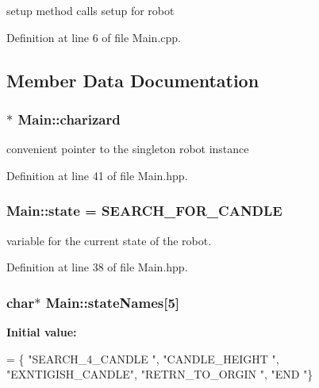 setup method calls setup for robot 



Definition at line 6 of file Main.\-cpp.



\subsection{Member Data Documentation}
\hypertarget{classMain_a6b8534d72e39e2b43c3d46f2ca6e49f4}{
\subsubsection[{charizard}]{$\ast$ Main\-::charizard\hspace{0.3cm}{\ttfamily [private]}}}\label{classMain_a6b8534d72e39e2b43c3d46f2ca6e49f4}


convenient pointer to the singleton robot instance 



Definition at line 41 of file Main.\-hpp.

\hypertarget{classMain_a8b4ada43c3c3720b177018191ac6ee90}{
\subsubsection[{state}]{ Main\-::state = {\bf S\-E\-A\-R\-C\-H\-\_\-\-F\-O\-R\-\_\-\-C\-A\-N\-D\-L\-E}\hspace{0.3cm}{\ttfamily [private]}}}\label{classMain_a8b4ada43c3c3720b177018191ac6ee90}


variable for the current state of the robot. 



Definition at line 38 of file Main.\-hpp.

\hypertarget{classMain_a10090d1fa7fa606c1bf7c5bdf23d7eda}{
\subsubsection[{state\-Names}]{\setlength{\rightskip}{0pt plus 5cm}char$\ast$ Main\-::state\-Names\mbox{[}5\mbox{]}\hspace{0.3cm}{\ttfamily [private]}}}\label{classMain_a10090d1fa7fa606c1bf7c5bdf23d7eda}
{\bfseries Initial value\-:}
\begin{DoxyCode}
= \{
      \textcolor{stringliteral}{"SEARCH\_4\_CANDLE "},
      \textcolor{stringliteral}{"CANDLE\_HEIGHT   "},
      \textcolor{stringliteral}{"EXNTIGISH\_CANDLE"},
      \textcolor{stringliteral}{"RETRN\_TO\_ORGIN  "},
      \textcolor{stringliteral}{"END             "}\}
\end{DoxyCode}



